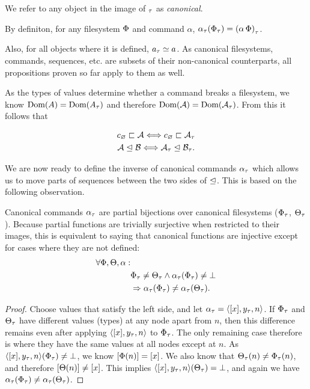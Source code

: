 We refer to any object in the image of ${}_\tau$ as \emph{canonical}.

By definiton,
for any filesystem $\Phi$ and command $\alpha$, 
${\alpha}_\tau({\Phi}_\tau) = {(\alpha\,\Phi)}_\tau$.


Also, for all objects where it is defined, ${a}_\tau\simeq a$.
As canonical filesystems, commands, sequences, etc.
are subsets of their non-canonical counterparts, 
all propositions proven so far apply to them as well.


As the types of values determine whether a command breaks a filesystem,
we know $\textrm{Dom}({A})=\textrm{Dom}({{A}_\tau})$ and therefore $\textrm{Dom}({\mathcal{A}})=\textrm{Dom}({{\mathcal{A}}_\tau})$.
From this it follows that
\begin{mycor}\label{repr_works_is_same}
\begin{gather*}
c_\varnothing\sqsubset{\mathcal{A}} \Longleftrightarrow c_\varnothing\sqsubset{{\mathcal{A}}_\tau} \\
{\mathcal{A}}\trianglelefteq{\mathcal{B}} \Longleftrightarrow {{\mathcal{A}}_\tau}\trianglelefteq{{\mathcal{B}}_\tau}.
\end{gather*}
\end{mycor}


We are now ready to define the inverse of canonical commands ${\alpha}_\tau$
which allows us to move parts of sequences between the
two sides of $\trianglelefteq$.
This is based on the following observation.

\begin{mylem}\label{repr_comm_inject}
Canonical commands ${\alpha}_\tau$ are partial bijections over canonical filesystems
(${\Phi}_\tau$, ${\Theta}_\tau$).
Because partial functions are trivially surjective when restricted to their images, this is
equivalent to saying that canonical functions are injective except for cases
where they are not defined:
\begin{align*}
\forall\Phi,\Theta,\alpha:& \\
& {\Phi}_\tau\neq{\Theta}_\tau \wedge {\alpha}_\tau({\Phi}_\tau)\neq\bot \\
& \Rightarrow {\alpha}_\tau({\Phi}_\tau) \neq {\alpha}_\tau({\Theta}_\tau).
\end{align*}
\end{mylem}
\begin{proof}
Choose values that satisfy the left side, and let ${\alpha}_\tau = \langle{[{x}],{y}_\tau,{n}}\rangle$.
If ${\Phi}_\tau$ and ${\Theta}_\tau$ have different values (types) at any node apart from $n$, then this difference remains
even after applying $\langle{[{x}],{y}_\tau,{n}}\rangle$ to ${\Phi}_\tau$. 
The only remaining case therefore is where they have the same values
at all nodes except at $n$.
As $\langle{[{x}],{y}_\tau,{n}}\rangle({\Phi}_\tau)\neq\bot$, we know $[\Phi(n)]=[x]$.
We also know that ${\Theta}_\tau(n)\neq{\Phi}_\tau(n)$, and therefore
$[\Theta(n)]\neq[x]$.
This implies $\langle{[{x}],{y}_\tau,{n}}\rangle({\Theta}_\tau)=\bot$,
and again we have ${\alpha}_\tau({\Phi}_\tau) \neq {\alpha}_\tau({\Theta}_\tau)$.
\end{proof}


